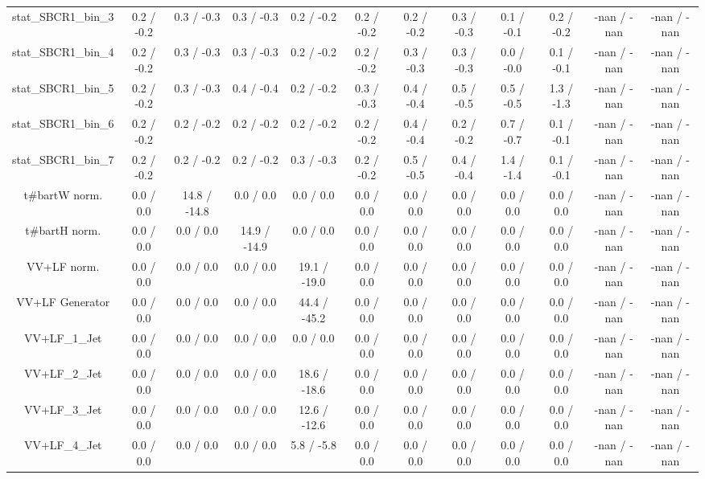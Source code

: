 \begin{table}[htbp]
\begin{center}
\begin{tabular}{|c|c|c|c|c|c|c|c|c|c|c|c|}
 stat_SBCR1_bin_3 & 0.2 / -0.2 & 0.3 / -0.3 & 0.3 / -0.3 & 0.2 / -0.2 & 0.2 / -0.2 & 0.2 / -0.2 & 0.3 / -0.3 & 0.1 / -0.1 & 0.2 / -0.2 & -nan / -nan & -nan / -nan \\ 
 stat_SBCR1_bin_4 & 0.2 / -0.2 & 0.3 / -0.3 & 0.3 / -0.3 & 0.2 / -0.2 & 0.2 / -0.2 & 0.3 / -0.3 & 0.3 / -0.3 & 0.0 / -0.0 & 0.1 / -0.1 & -nan / -nan & -nan / -nan \\ 
 stat_SBCR1_bin_5 & 0.2 / -0.2 & 0.3 / -0.3 & 0.4 / -0.4 & 0.2 / -0.2 & 0.3 / -0.3 & 0.4 / -0.4 & 0.5 / -0.5 & 0.5 / -0.5 & 1.3 / -1.3 & -nan / -nan & -nan / -nan \\ 
 stat_SBCR1_bin_6 & 0.2 / -0.2 & 0.2 / -0.2 & 0.2 / -0.2 & 0.2 / -0.2 & 0.2 / -0.2 & 0.4 / -0.4 & 0.2 / -0.2 & 0.7 / -0.7 & 0.1 / -0.1 & -nan / -nan & -nan / -nan \\ 
 stat_SBCR1_bin_7 & 0.2 / -0.2 & 0.2 / -0.2 & 0.2 / -0.2 & 0.3 / -0.3 & 0.2 / -0.2 & 0.5 / -0.5 & 0.4 / -0.4 & 1.4 / -1.4 & 0.1 / -0.1 & -nan / -nan & -nan / -nan \\ 
  t#bar{t}W norm. & 0.0 / 0.0 & 14.8 / -14.8 & 0.0 / 0.0 & 0.0 / 0.0 & 0.0 / 0.0 & 0.0 / 0.0 & 0.0 / 0.0 & 0.0 / 0.0 & 0.0 / 0.0 & -nan / -nan & -nan / -nan \\ 
  t#bar{t}H norm. & 0.0 / 0.0 & 0.0 / 0.0 & 14.9 / -14.9 & 0.0 / 0.0 & 0.0 / 0.0 & 0.0 / 0.0 & 0.0 / 0.0 & 0.0 / 0.0 & 0.0 / 0.0 & -nan / -nan & -nan / -nan \\ 
  VV+LF norm. & 0.0 / 0.0 & 0.0 / 0.0 & 0.0 / 0.0 & 19.1 / -19.0 & 0.0 / 0.0 & 0.0 / 0.0 & 0.0 / 0.0 & 0.0 / 0.0 & 0.0 / 0.0 & -nan / -nan & -nan / -nan \\ 
  VV+LF Generator & 0.0 / 0.0 & 0.0 / 0.0 & 0.0 / 0.0 & 44.4 / -45.2 & 0.0 / 0.0 & 0.0 / 0.0 & 0.0 / 0.0 & 0.0 / 0.0 & 0.0 / 0.0 & -nan / -nan & -nan / -nan \\ 
  VV+LF_1_Jet & 0.0 / 0.0 & 0.0 / 0.0 & 0.0 / 0.0 & 0.0 / 0.0 & 0.0 / 0.0 & 0.0 / 0.0 & 0.0 / 0.0 & 0.0 / 0.0 & 0.0 / 0.0 & -nan / -nan & -nan / -nan \\ 
  VV+LF_2_Jet & 0.0 / 0.0 & 0.0 / 0.0 & 0.0 / 0.0 & 18.6 / -18.6 & 0.0 / 0.0 & 0.0 / 0.0 & 0.0 / 0.0 & 0.0 / 0.0 & 0.0 / 0.0 & -nan / -nan & -nan / -nan \\ 
  VV+LF_3_Jet & 0.0 / 0.0 & 0.0 / 0.0 & 0.0 / 0.0 & 12.6 / -12.6 & 0.0 / 0.0 & 0.0 / 0.0 & 0.0 / 0.0 & 0.0 / 0.0 & 0.0 / 0.0 & -nan / -nan & -nan / -nan \\ 
  VV+LF_4_Jet & 0.0 / 0.0 & 0.0 / 0.0 & 0.0 / 0.0 & 5.8 / -5.8 & 0.0 / 0.0 & 0.0 / 0.0 & 0.0 / 0.0 & 0.0 / 0.0 & 0.0 / 0.0 & -nan / -nan & -nan / -nan \\ 

\end{tabular}
\end{center}
\end{table}
